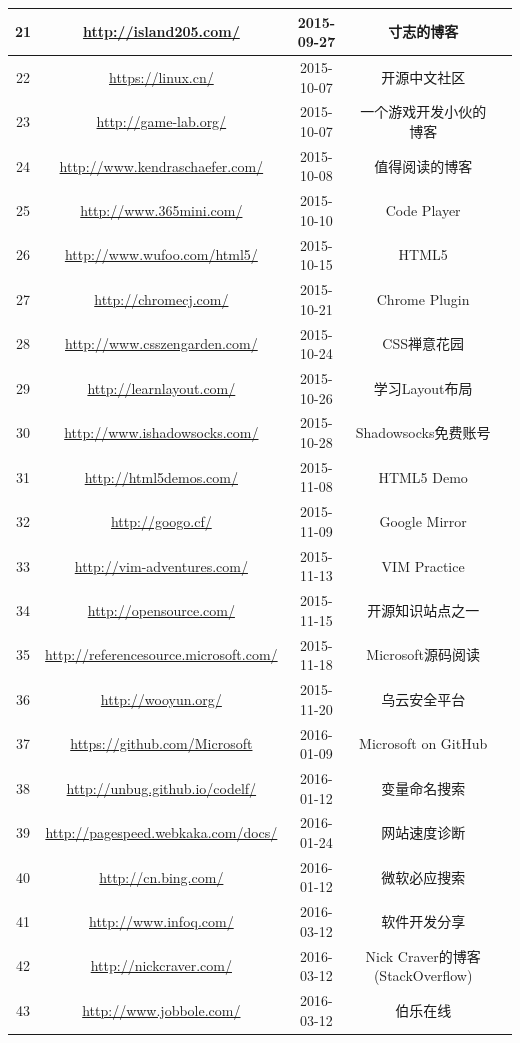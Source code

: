 \documentclass{book}
\begin{document}
\begin{longtable}{|c|c|c|c|c|}
	\hline
	21 & \url{http://island205.com/} & 2015-09-27 & 寸志的博客\\
	\hline
	22 & \url{https://linux.cn/} & 2015-10-07 & 开源中文社区\\
	\hline
	23 & \url{http://game-lab.org/} & 2015-10-07 & 一个游戏开发小伙的博客\\
	\hline
	24 & \url{http://www.kendraschaefer.com/} & 2015-10-08 & 值得阅读的博客\\
	\hline
	25 & \url{http://www.365mini.com/} & 2015-10-10 & Code Player\\
	\hline
	26 & \url{http://www.wufoo.com/html5/} & 2015-10-15 & HTML5\\
	\hline
	27 & \url{http://chromecj.com/} & 2015-10-21 & Chrome Plugin\\
	\hline
	28 & \url{http://www.csszengarden.com/} & 2015-10-24 & CSS禅意花园\\
	\hline
	29 & \url{http://learnlayout.com/} & 2015-10-26 & 学习Layout布局\\
	\hline
	30 & \url{http://www.ishadowsocks.com/} & 2015-10-28 & Shadowsocks免费账号\\
	\hline
	31 & \url{http://html5demos.com/} & 2015-11-08 & HTML5 Demo\\
	\hline
	32 & \url{http://googo.cf/} & 2015-11-09 & Google Mirror\\
	\hline
	33 & \url{http://vim-adventures.com/} & 2015-11-13 & VIM Practice\\
	\hline
	34 & \url{http://opensource.com/} &  2015-11-15 & 开源知识站点之一\\
	\hline
	35 & \url{http://referencesource.microsoft.com/} & 2015-11-18 & Microsoft源码阅读\\
	\hline
	36 & \url{http://wooyun.org/} & 2015-11-20 & 乌云安全平台\\
	\hline
	37 & \url{https://github.com/Microsoft} & 2016-01-09 & Microsoft on GitHub\\
	\hline
	38 & \url{http://unbug.github.io/codelf/} & 2016-01-12 & 变量命名搜索\\
	\hline
	39 & \url{http://pagespeed.webkaka.com/docs/} & 2016-01-24 & 网站速度诊断 \\
	\hline
	40 & \url{http://cn.bing.com/} & 2016-01-12 & 微软必应搜索\\
	\hline
	41 & \url{http://www.infoq.com/} & 2016-03-12 & 软件开发分享\\
	\hline
	42 & \url{http://nickcraver.com/} & 2016-03-12 & Nick Craver的博客(StackOverflow)\\
	\hline
	43 & \url{http://www.jobbole.com/} & 2016-03-12 & 伯乐在线\\

\end{longtable}
\end{document}
